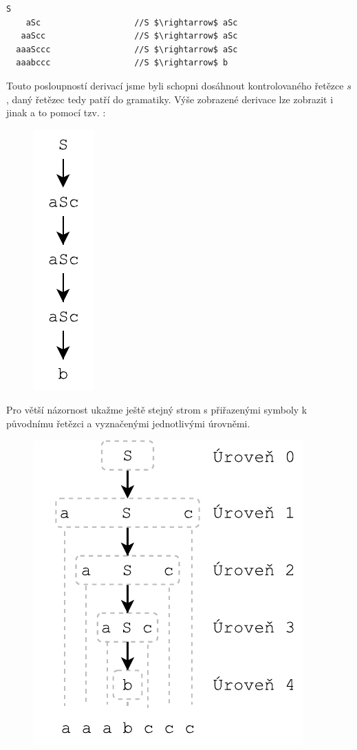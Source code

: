 \begin{lstlisting}[mathescape]
     S
    aSc                   //S $\rightarrow$ aSc
   aaScc                  //S $\rightarrow$ aSc
  aaaSccc                 //S $\rightarrow$ aSc
  aaabccc                 //S $\rightarrow$ b
\end{lstlisting}

\noindent
Touto posloupností derivací jsme byli schopni dosáhnout kontrolovaného řetězce $s$,
daný řetězec tedy patří do gramatiky. Výše zobrazené derivace lze zobrazit
i jinak a to pomocí tzv. :

\begin{figure}[H]
  \centering
  \includegraphics{fig/Derivations1.pdf}
\end{figure}

\noindent
Pro větší názornost ukažme ještě stejný strom s přiřazenými symboly k původnímu
řetězci a vyznačenými jednotlivými úrovněmi.

\begin{figure}[H]
  \centering
  \includegraphics{fig/Derivations2.pdf}
\end{figure}

